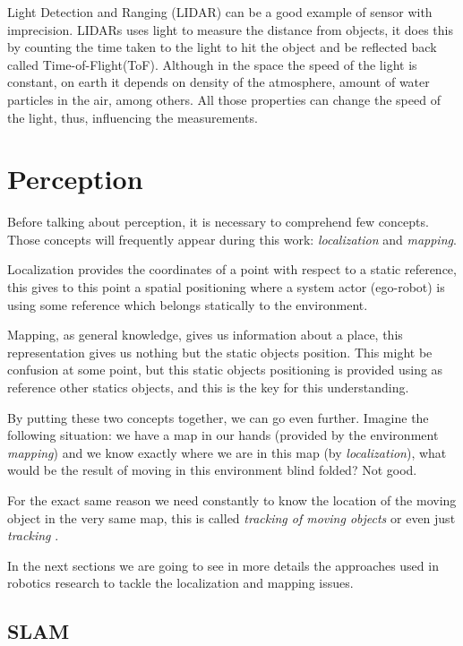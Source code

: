 Light Detection and Ranging (LIDAR) can be a good example of sensor with imprecision. LIDARs uses light to measure the distance from objects, it does this by counting the time taken to the light to hit the object and be reflected back called Time-of-Flight(ToF). Although in the space the speed of the light is constant, on earth it depends on density of the atmosphere, amount of water particles in the air, among others. All those properties can change the speed of the light, thus, influencing the measurements.

\section{Perception}

Before talking about perception, it is necessary to comprehend few concepts. Those concepts will frequently appear during this work: \textit{localization} and \textit{mapping}.

Localization provides the coordinates of a point with respect to a static reference, this gives to this point a spatial positioning where a system actor (ego-robot) is using some reference which belongs statically to the environment.  

Mapping, as general knowledge, gives us information about a place, this representation gives us nothing but the static objects position. This might be confusion at some point, but this static objects positioning is provided using as reference other statics objects, and this is the key for this understanding.

By putting these two concepts together, we can go even further. Imagine the following situation: we have a map in our hands (provided by the environment \textit{mapping}) and we know exactly where we are in this map (by \textit{localization}), what would be the result of moving in this environment blind folded? Not good.

For the exact same reason we need constantly to know the location of the moving object in the very same map, this is called \textit{tracking of moving objects} or even just \textit{tracking} \cite{Wang04a}.

In the next sections we are going to see in more details the approaches used in robotics research to tackle the localization and mapping issues.

\subsection{SLAM}

